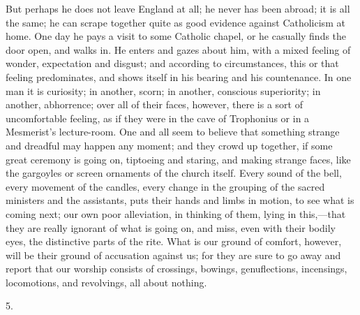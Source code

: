But perhaps he does not leave England at all; he never
has been abroad; it is all the same; he can scrape
together quite as good evidence against Catholicism at
home. One day he pays a visit to some Catholic chapel, or
he casually finds the door open, and walks in. He enters
and gazes about him, with a mixed feeling of wonder,
expectation and disgust; and according to circumstances,
this or that feeling predominates, and shows itself in
his bearing and his countenance. In one man it is
curiosity; in another, scorn; in another, conscious
superiority; in another, abhorrence; over all of their
faces, however, there is a sort of uncomfortable feeling,
as if they were in the cave of Trophonius or in a
Mesmerist's lecture-room. One and all seem to believe
that something strange and dreadful may happen any
moment; and they crowd up together, if some great
ceremony is going on, tiptoeing and staring, and making
strange faces, like the gargoyles or screen ornaments of
the church itself. Every sound of the bell, every
movement of the candles, every change in the grouping of
the sacred ministers and the assistants, puts their hands
and limbs in motion, to see what is coming next; our own
poor alleviation, in thinking of them, lying in
this,—that they are really ignorant of what is going
on, and miss, even with their bodily eyes, the
distinctive parts of the rite. What is our ground of
comfort, however, will be their ground of accusation
against us; for they are sure to go away and report that
our worship consists of crossings, bowings,
genuflections, incensings, locomotions, and revolvings,
all about nothing.

5.

